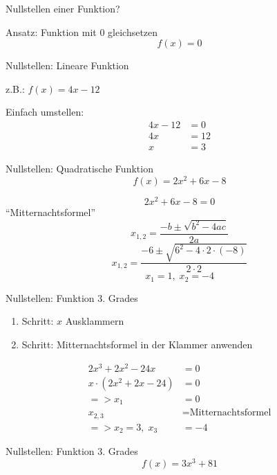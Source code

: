 \newenvironment{antwort}{%
	\clearpage
	\vspace*{\fill}
	\begin{center}\large
}{%
	\end{center}
	\vspace*{\fill}
}
\begin{frage}Nullstellen einer Funktion?\end{frage}
\begin{antwort}Ansatz: Funktion mit 0 gleichsetzen
	\[
	f(x)=0
	\]\end{antwort}
\begin{frage}Nullstellen: Lineare Funktion
		
	z.B.: $f(x)=4x-12$\end{frage}
\begin{antwort}Einfach umstellen:
	\begin{align*}
	4x-12&=0 \\
	4x&=12 \\
	x&=3
	\end{align*}\end{antwort}
\begin{frage}Nullstellen: Quadratische Funktion
	\[
		f(x)=2x^2+6x-8
	\]\end{frage}
\begin{antwort}\[
		2x^2+6x-8=0
		\]
	"`Mitternachtsformel"'
	\[
		x_{1,2}=\frac{-b\pm\sqrt{b^2-4ac}}{2a}
	\]
	\[
	x_{1,2}=\frac{-6\pm\sqrt{6^2-4\cdot2\cdot(-8)}}{2\cdot2 }
	\]
	\[
	x_{1}=1,\;x_{2}=-4
	\]\end{antwort}
\begin{frage}Nullstellen: Funktion 3. Grades\end{frage}
\begin{antwort}\normalsize\begin{enumerate}
		\item Schritt: $x$ Ausklammern
		\item Schritt: Mitternachtsformel in der Klammer anwenden
	\end{enumerate}
	\normalsize\begin{align*}
		2x^3+2x^2-24x&=0\\
		x\cdot(2x^2+2x-24)&=0\\
		=>	x_{1}&= 0\\
		x_{2,3}&= \text{Mitternachtsformel}\\
		=>	x_{2}=3,\;x_{3}&=-4
	\end{align*}\end{antwort}
\begin{frage}Nullstellen: Funktion 3. Grades
	\[
	f(x)=3x^3+81
	\]\end{frage}
